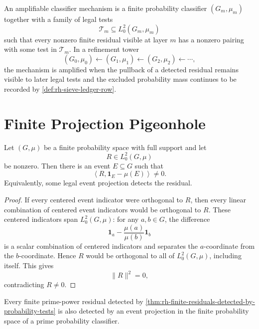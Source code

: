 \begin{definition}
\label{def:rh-amplifiable-classifier-mechanism}
An amplifiable classifier mechanism is a finite probability classifier
$(G_m,\mu_m)$ together with a family of legal tests
$$
\mathcal T_m\subseteq L^2_0(G_m,\mu_m)
$$
such that every nonzero finite residual visible at layer $m$ has a
nonzero pairing with some test in $\mathcal T_m$.  In a refinement tower
$$
(G_0,\mu_0)\leftarrow(G_1,\mu_1)\leftarrow(G_2,\mu_2)\leftarrow\cdots,
$$
the mechanism is amplified when the pullback of a detected residual
remains visible to later legal tests and the excluded probability mass
continues to be recorded by \autoref{def:rh-sieve-ledger-row}.
\end{definition}

\section{Finite Projection Pigeonhole}
\label{sec:rh-probability-sieve-tower-finite-pigeonhole}

\begin{theorem}
\label{thm:rh-finite-probability-pigeonhole}
Let $(G,\mu)$ be a finite probability space with full support and let
$$
R\in L^2_0(G,\mu)
$$
be nonzero.  Then there is an event $E\subseteq G$ such that
$$
\left\langle R,\mathbf 1_E-\mu(E)\right\rangle\ne0.
$$
Equivalently, some legal event projection detects the residual.
\end{theorem}

\begin{proof}
If every centered event indicator were orthogonal to $R$, then every
linear combination of centered event indicators would be orthogonal to
$R$.  These centered indicators span $L^2_0(G,\mu)$: for any
$a,b\in G$, the difference
$$
\mathbf 1_a-\frac{\mu(a)}{\mu(b)}\mathbf 1_b
$$
is a scalar combination of centered indicators and separates the
$a$-coordinate from the $b$-coordinate.  Hence $R$ would be orthogonal
to all of $L^2_0(G,\mu)$, including itself.  This gives
$$
\|R\|^2=0,
$$
contradicting $R\ne0$.
\end{proof}

\begin{theorem}
\label{thm:rh-classifier-pigeonhole-supplies-probability-detection}
Every finite prime-power residual detected by
\autoref{thm:rh-finite-residuals-detected-by-probability-tests} is also
detected by an event projection in the finite probability space of a
prime probability classifier.
\end{theorem}

